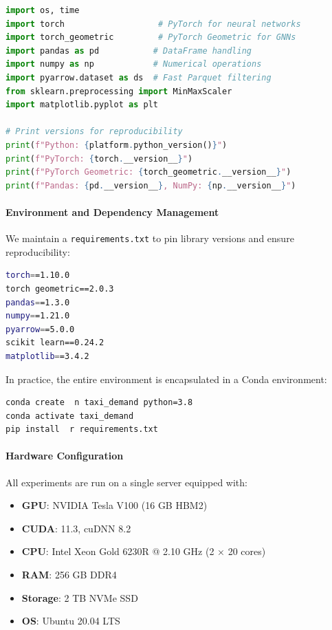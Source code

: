 \documentclass{article}
\begin{document}
\begin{lstlisting}[language=Python, caption={Key Library Imports and Version Checks}]
import os, time
import torch                   # PyTorch for neural networks
import torch_geometric         # PyTorch Geometric for GNNs
import pandas as pd           # DataFrame handling
import numpy as np            # Numerical operations
import pyarrow.dataset as ds  # Fast Parquet filtering
from sklearn.preprocessing import MinMaxScaler
import matplotlib.pyplot as plt

# Print versions for reproducibility
print(f"Python: {platform.python_version()}")
print(f"PyTorch: {torch.__version__}")
print(f"PyTorch Geometric: {torch_geometric.__version__}")
print(f"Pandas: {pd.__version__}, NumPy: {np.__version__}")
\end{lstlisting}

\paragraph{Environment and Dependency Management}  
We maintain a \texttt{requirements.txt} to pin library versions and ensure reproducibility:

\begin{lstlisting}[language=bash, caption={Example \texttt{requirements.txt}}]
torch==1.10.0
torch geometric==2.0.3
pandas==1.3.0
numpy==1.21.0
pyarrow==5.0.0
scikit learn==0.24.2
matplotlib==3.4.2
\end{lstlisting}

In practice, the entire environment is encapsulated in a Conda environment:
\begin{lstlisting}[language=bash, caption={Conda Environment Creation}]
conda create  n taxi_demand python=3.8
conda activate taxi_demand
pip install  r requirements.txt
\end{lstlisting}

\paragraph{Hardware Configuration}  
All experiments are run on a single server equipped with:
\begin{itemize}
  \item \textbf{GPU}: NVIDIA Tesla V100 (16 GB HBM2)  
  \item \textbf{CUDA}: 11.3, cuDNN 8.2  
  \item \textbf{CPU}: Intel Xeon Gold 6230R @ 2.10 GHz (2 × 20 cores)  
  \item \textbf{RAM}: 256 GB DDR4  
  \item \textbf{Storage}: 2 TB NVMe SSD  
  \item \textbf{OS}: Ubuntu 20.04 LTS  
\end{itemize}
\end{document}
